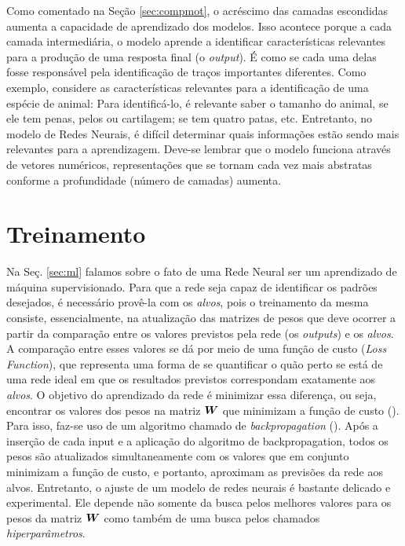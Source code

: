 

Como comentado na Seção \ref{sec:compmot}, o acréscimo das camadas escondidas aumenta a capacidade de aprendizado dos modelos. Isso acontece porque a cada camada intermediária, o modelo aprende a identificar características relevantes para a produção de uma resposta final (o \textit{output}). É como se cada uma delas fosse responsável pela identificação de traços importantes diferentes. Como exemplo, considere as características relevantes para a identificação de uma espécie de animal: Para identificá-lo, é relevante saber o tamanho do animal, se ele tem penas, pelos ou cartilagem; se tem quatro patas, etc.  
Entretanto, no modelo de Redes Neurais, é difícil determinar quais informações estão sendo mais relevantes para a aprendizagem. Deve-se lembrar que o modelo funciona através de vetores numéricos, representações que se tornam cada vez mais abstratas conforme a profundidade (número de camadas) aumenta.

\section{Treinamento}

Na Seç. \ref{sec:ml} falamos sobre o fato de uma Rede Neural ser um aprendizado de máquina supervisionado. Para que a rede seja capaz de identificar os padrões desejados, é necessário provê-la com os \textit{alvos}, pois o treinamento da mesma consiste, essencialmente, na atualização das matrizes de pesos que deve ocorrer a partir da comparação entre os valores previstos pela rede (os \textit{outputs}) e os \textit{alvos}. A comparação entre esses valores se dá por meio de uma função de custo (\textit{Loss Function}), que representa uma forma de se quantificar o quão perto se está de uma rede ideal em que os resultados previstos correspondam exatamente aos \textit{alvos}. O objetivo do aprendizado da rede é minimizar essa diferença, ou seja, encontrar os valores dos pesos na matriz $\bm{W}$ que minimizam a função de custo (\cite{josh:2017}). Para isso, faz-se uso de um algoritmo chamado de \textit{backpropagation} (\cite{Goodfellow-et-al-2016}). Após a inserção de cada input e a aplicação do algoritmo de backpropagation, todos os pesos são atualizados simultaneamente com os valores que em conjunto minimizam a função de custo, e portanto, aproximam as previsões da rede aos alvos. Entretanto, o ajuste de um modelo de redes neurais é bastante delicado e experimental. Ele depende não somente da busca pelos melhores valores para os pesos da matriz $\bm{W}$ como também de uma busca pelos chamados \textit{hiperparâmetros}. 

